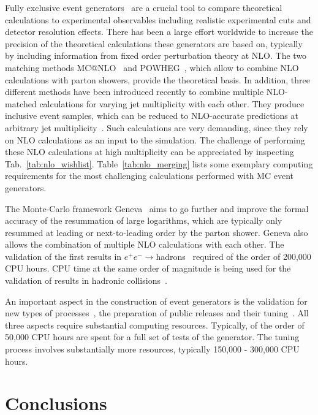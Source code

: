 Fully exclusive event generators~\cite{Buckley:2011ms} are a crucial tool 
to compare theoretical calculations to experimental observables including
realistic experimental cuts and detector resolution effects. 
There has been a large effort worldwide to increase the precision 
of the theoretical calculations these generators are based on, 
typically by including information from fixed order perturbation theory 
at NLO. The two matching methods MC@NLO~\cite{Frixione:2002ik} and 
POWHEG~\cite{Nason:2004rx}, which allow to combine NLO calculations with
parton showers, provide the theoretical basis. In addition, three different 
methods have been introduced recently to combine multiple NLO-matched 
calculations for varying jet multiplicity with each other.
They produce inclusive event samples, which can be reduced to NLO-accurate 
predictions at arbitrary jet multiplicity~\cite{Hoeche:2012yf,Lonnblad:2012ix,Frederix:2012ps}.
Such calculations are very demanding, since they rely on NLO calculations 
as an input to the simulation. The challenge of performing these NLO
calculations at high multiplicity can be appreciated by inspecting
Tab.~\ref{tab:nlo_wishlist}. Table~\ref{tab:nlo_merging} lists some 
exemplary computing requirements for the most challenging calculations
performed with MC event generators.

The Monte-Carlo framework Geneva~\cite{Alioli:2012fc} aims to go further 
and improve the formal accuracy of the resummation of large logarithms, 
which are typically only resummed at leading or next-to-leading order 
by the parton shower. Geneva also allows the combination of multiple 
NLO calculations with each other. The validation of the first results in 
$e^+ e^-\to$hadrons~\cite{Alioli:2012fc} required of the order of 200,000 
CPU hours. CPU time at the same order of magnitude is being used for the
validation of results in hadronic collisions~\cite{Alioli:2013vza}.

An important aspect in the construction of event generators is the validation
for new types of processes~\cite{Buckley:2010ar}, the preparation of 
public releases and their tuning~\cite{Buckley:2009bj}. 
All three aspects require substantial computing resources. Typically,
of the order of 50,000 CPU hours are spent for a full set of tests of the 
generator. The tuning process involves substantially more resources, typically
150,000 - 300,000 CPU hours.


\section{Conclusions}
\label{sec:summary}

